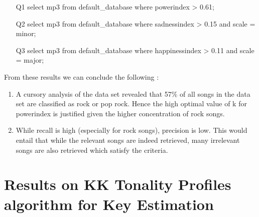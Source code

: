 \begin{enumerate}
\item [Q1] select mp3 from default\_database where powerindex > 0.61;
\item [Q2] select mp3 from default\_database where sadnessindex > 0.15 and scale = minor;
\item [Q3] select mp3 from default\_database where happinessindex > 0.11 and scale = major;
\end{enumerate}

From these results we can conclude the following : 

\begin{enumerate}
\item A cursory analysis of the data set revealed that 57\% of all songs in the data set are classified as rock or pop rock. Hence the high optimal value of k for powerindex is justified given the higher concentration of rock songs. 
\item While recall is high (especially for rock songs), precision is low. This would entail that while the relevant songs are indeed retrieved, many irrelevant songs are also retrieved which satisfy the criteria. 
\end{enumerate}

\section{Results on KK Tonality Profiles algorithm for Key Estimation}

